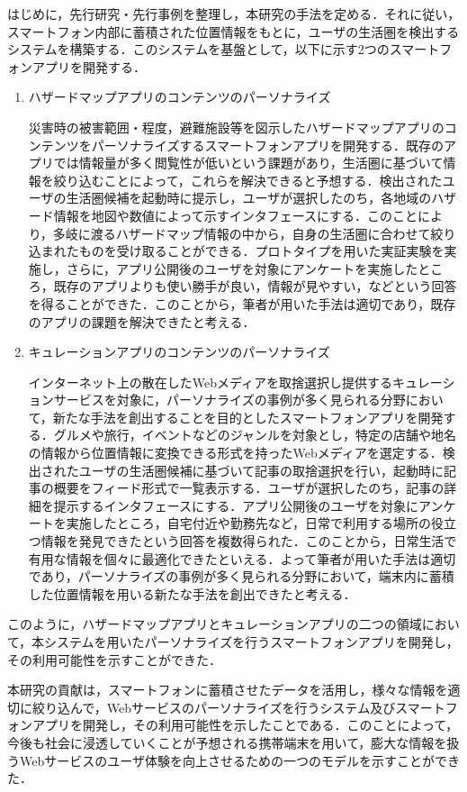 \documentclass[a4paper]{jsarticle}
\begin{document}
はじめに，先行研究・先行事例を整理し，本研究の手法を定める．それに従い，スマートフォン内部に蓄積された位置情報をもとに，ユーザの生活圏を検出するシステムを構築する．このシステムを基盤として，以下に示す2つのスマートフォンアプリを開発する．
\begin{enumerate}
  \item ハザードマップアプリのコンテンツのパーソナライズ

  災害時の被害範囲・程度，避難施設等を図示したハザードマップアプリのコンテンツをパーソナライズするスマートフォンアプリを開発する．既存のアプリでは情報量が多く閲覧性が低いという課題があり，生活圏に基づいて情報を絞り込むことによって，これらを解決できると予想する．検出されたユーザの生活圏候補を起動時に提示し，ユーザが選択したのち，各地域のハザード情報を地図や数値によって示すインタフェースにする．このことにより，多岐に渡るハザードマップ情報の中から，自身の生活圏に合わせて絞り込まれたものを受け取ることができる．プロトタイプを用いた実証実験を実施し，さらに，アプリ公開後のユーザを対象にアンケートを実施したところ，既存のアプリよりも使い勝手が良い，情報が見やすい，などという回答を得ることができた．このことから，筆者が用いた手法は適切であり，既存のアプリの課題を解決できたと考える．

  \item キュレーションアプリのコンテンツのパーソナライズ

  インターネット上の散在したWebメディアを取捨選択し提供するキュレーションサービスを対象に，パーソナライズの事例が多く見られる分野において，新たな手法を創出することを目的としたスマートフォンアプリを開発する．グルメや旅行，イベントなどのジャンルを対象とし，特定の店舗や地名の情報から位置情報に変換できる形式を持ったWebメディアを選定する．検出されたユーザの生活圏候補に基づいて記事の取捨選択を行い，起動時に記事の概要をフィード形式で一覧表示する．ユーザが選択したのち，記事の詳細を提示するインタフェースにする．アプリ公開後のユーザを対象にアンケートを実施したところ，自宅付近や勤務先など，日常で利用する場所の役立つ情報を発見できたという回答を複数得られた．このことから，日常生活で有用な情報を個々に最適化できたといえる．よって筆者が用いた手法は適切であり，パーソナライズの事例が多く見られる分野において，端末内に蓄積した位置情報を用いる新たな手法を創出できたと考える．
\end{enumerate}

このように，ハザードマップアプリとキュレーションアプリの二つの領域において，本システムを用いたパーソナライズを行うスマートフォンアプリを開発し，その利用可能性を示すことができた．

本研究の貢献は，スマートフォンに蓄積させたデータを活用し，様々な情報を適切に絞り込んで，Webサービスのパーソナライズを行うシステム及びスマートフォンアプリを開発し，その利用可能性を示したことである．このことによって，今後も社会に浸透していくことが予想される携帯端末を用いて，膨大な情報を扱うWebサービスのユーザ体験を向上させるための一つのモデルを示すことができた．
\end{document}
